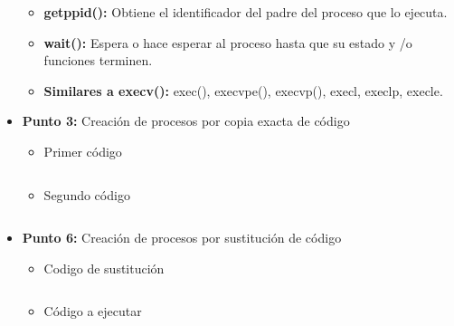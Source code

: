\documentclass[12pt]{article}
\begin{document}
\begin{itemize}
\begin{itemize}
        \item \textbf{getppid():} Obtiene el identificador del padre del proceso que lo ejecuta.

        \item \textbf{wait():} Espera o hace esperar al proceso hasta que su estado y /o funciones terminen.   
        
        \item \textbf{Similares a execv():  } exec(), execvpe(), execvp(), execl, execlp, execle.       
        
                                                                        
        \end{itemize}
        
        \item[\Checkmark] \textbf{Punto 3:} Creación de procesos por copia exacta de código
        \begin{multicols}{2}
            \begin{itemize}
                \item Primer código 
                    \inputminted{c++}{Code/Linux/3.c}
                \columnbreak                    
                \item Segundo código
                    \inputminted{c++}{Code/Linux/3_1.c} 
            \end{itemize}
            \end{multicols}
        \newpage            
        \item[\Checkmark] \textbf{Punto 6:} Creación de procesos por sustitución de código
        \begin{multicols}{2}
            \begin{itemize}
                \item Codigo de sustitución
                    \inputminted{c++}{Code/Linux/6.c}
                    \columnbreak                            
                \item Código a ejecutar
                        \inputminted{c++}{Code/Linux/hola.c} 
            \end{itemize}
            \end{multicols}
        \end{itemize}
        
    
\end{document}
